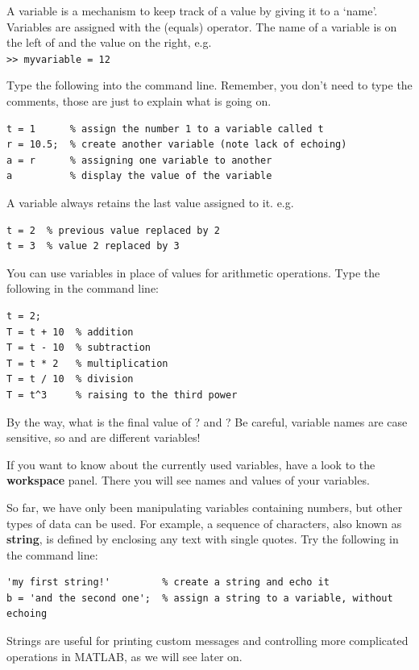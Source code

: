 \documentclass{article}
\begin{document}
A variable is a mechanism to keep track of a value by giving it to a `name'.
Variables are assigned with the \mcode{=} (equals) operator.
The name of a variable is on the left of \mcode{=} and the value on the right, e.g.\\
\verb|>> myvariable = 12|

Type the following into the command line.
Remember, you don't need to type the comments, those are just to explain what is going on.
\begin{lstlisting}
t = 1      % assign the number 1 to a variable called t
r = 10.5;  % create another variable (note lack of echoing)
a = r      % assigning one variable to another
a          % display the value of the variable
\end{lstlisting}

A variable always retains the last value assigned to it. e.g.
\begin{lstlisting}
t = 2  % previous value replaced by 2
t = 3  % value 2 replaced by 3
\end{lstlisting}

You can use variables in place of values for arithmetic operations.
Type the following in the command line:
\begin{lstlisting}
t = 2;
T = t + 10  % addition
T = t - 10  % subtraction
T = t * 2   % multiplication
T = t / 10  % division
T = t^3     % raising to the third power
\end{lstlisting}

By the way, what is the final value of ? and ?
Be careful, variable names are case sensitive, so  and  are different variables!

If you want to know about the currently used variables, have a look to the \textbf{workspace} panel.
There you will see names and values of your variables.

So far, we have only been manipulating variables containing numbers, but other types of data can be used.
For example, a sequence of characters, also known as \textbf{string}, is defined by enclosing any text with single quotes.
Try the following in the command line:
\begin{lstlisting}
'my first string!'         % create a string and echo it
b = 'and the second one';  % assign a string to a variable, without echoing
\end{lstlisting}
Strings are useful for printing custom messages and controlling more complicated
operations in MATLAB, as we will see later on. 
\end{document}
